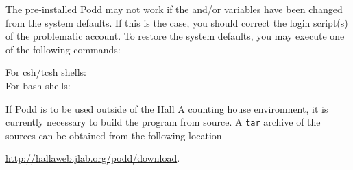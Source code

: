 {{The pre-installed Podd may not work if
the  and/or  variables have been
changed from the system defaults. If this is the case, you should
correct the login script(s) of the problematic account.
To restore the system defaults, you may execute one of the following
commands:

\begin{tabbing}
For csh/tcsh shells:$\qquad$ \= \\
For bash shells:     \> 
\end{tabbing}

If Podd is to be used outside of the Hall A counting house
environment, it is currently necessary to build the program from source.
A {\tt tar} archive of the sources can be obtained from the following
location
\begin{center}
  \url{http://hallaweb.jlab.org/podd/download}.
\end{center}

}}
